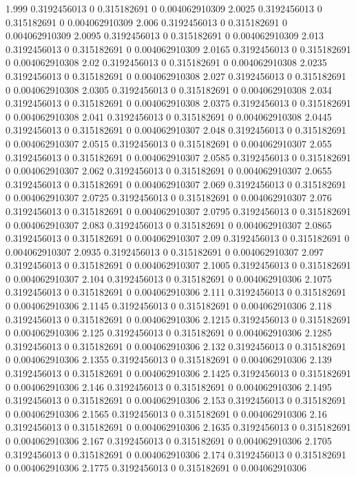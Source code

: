 {1.999 0.3192456013 0 0.315182691 0 0.004062910309
2.0025 0.3192456013 0 0.315182691 0 0.004062910309
2.006 0.3192456013 0 0.315182691 0 0.004062910309
2.0095 0.3192456013 0 0.315182691 0 0.004062910309
2.013 0.3192456013 0 0.315182691 0 0.004062910309
2.0165 0.3192456013 0 0.315182691 0 0.004062910308
2.02 0.3192456013 0 0.315182691 0 0.004062910308
2.0235 0.3192456013 0 0.315182691 0 0.004062910308
2.027 0.3192456013 0 0.315182691 0 0.004062910308
2.0305 0.3192456013 0 0.315182691 0 0.004062910308
2.034 0.3192456013 0 0.315182691 0 0.004062910308
2.0375 0.3192456013 0 0.315182691 0 0.004062910308
2.041 0.3192456013 0 0.315182691 0 0.004062910308
2.0445 0.3192456013 0 0.315182691 0 0.004062910307
2.048 0.3192456013 0 0.315182691 0 0.004062910307
2.0515 0.3192456013 0 0.315182691 0 0.004062910307
2.055 0.3192456013 0 0.315182691 0 0.004062910307
2.0585 0.3192456013 0 0.315182691 0 0.004062910307
2.062 0.3192456013 0 0.315182691 0 0.004062910307
2.0655 0.3192456013 0 0.315182691 0 0.004062910307
2.069 0.3192456013 0 0.315182691 0 0.004062910307
2.0725 0.3192456013 0 0.315182691 0 0.004062910307
2.076 0.3192456013 0 0.315182691 0 0.004062910307
2.0795 0.3192456013 0 0.315182691 0 0.004062910307
2.083 0.3192456013 0 0.315182691 0 0.004062910307
2.0865 0.3192456013 0 0.315182691 0 0.004062910307
2.09 0.3192456013 0 0.315182691 0 0.004062910307
2.0935 0.3192456013 0 0.315182691 0 0.004062910307
2.097 0.3192456013 0 0.315182691 0 0.004062910307
2.1005 0.3192456013 0 0.315182691 0 0.004062910307
2.104 0.3192456013 0 0.315182691 0 0.004062910306
2.1075 0.3192456013 0 0.315182691 0 0.004062910306
2.111 0.3192456013 0 0.315182691 0 0.004062910306
2.1145 0.3192456013 0 0.315182691 0 0.004062910306
2.118 0.3192456013 0 0.315182691 0 0.004062910306
2.1215 0.3192456013 0 0.315182691 0 0.004062910306
2.125 0.3192456013 0 0.315182691 0 0.004062910306
2.1285 0.3192456013 0 0.315182691 0 0.004062910306
2.132 0.3192456013 0 0.315182691 0 0.004062910306
2.1355 0.3192456013 0 0.315182691 0 0.004062910306
2.139 0.3192456013 0 0.315182691 0 0.004062910306
2.1425 0.3192456013 0 0.315182691 0 0.004062910306
2.146 0.3192456013 0 0.315182691 0 0.004062910306
2.1495 0.3192456013 0 0.315182691 0 0.004062910306
2.153 0.3192456013 0 0.315182691 0 0.004062910306
2.1565 0.3192456013 0 0.315182691 0 0.004062910306
2.16 0.3192456013 0 0.315182691 0 0.004062910306
2.1635 0.3192456013 0 0.315182691 0 0.004062910306
2.167 0.3192456013 0 0.315182691 0 0.004062910306
2.1705 0.3192456013 0 0.315182691 0 0.004062910306
2.174 0.3192456013 0 0.315182691 0 0.004062910306
2.1775 0.3192456013 0 0.315182691 0 0.004062910306
}
